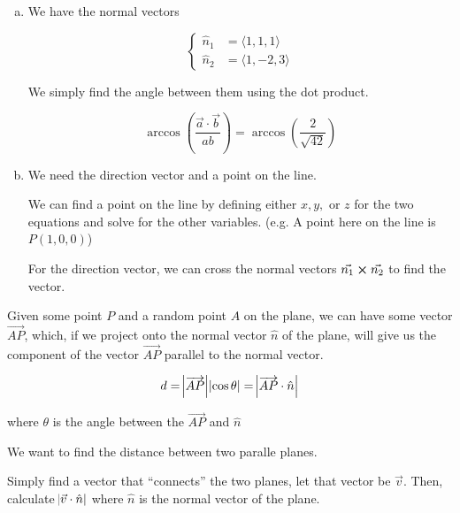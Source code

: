\begin{sol}
	\begin{enumerate}[a)]
		\item We have the normal vectors

		\begin{equation}
			\begin{cases}
				\hat n_1 &= \langle 1, 1, 1 \rangle\\
				\hat n_2 &= \langle 1, -2, 3 \rangle
			\end{cases}
		\end{equation}

		We simply find the angle between them using the dot product.

		\begin{equation}
			\arccos\left(\frac{\vec a \cdot \vec b}{ab}\right) = \arccos\left(\frac{2}{\sqrt{42}}\right)
		\end{equation}

		\item We need the direction vector and a point on the line.
		
		We can find a point on the line by defining either $x, y,$ or $z$ for the two equations and solve for the other variables. (e.g. A point here on the line is $P(1,0,0)$)

		For the direction vector, we can cross the normal vectors $\vec{n_1} \cross \vec{n_2}$ to find the vector.
	\end{enumerate}
\end{sol}

\begin{definition}
	Given some point $P$ and a random point $A$ on the plane, we can have some vector $\overrightarrow{AP}$, which, if we project onto the normal vector $\hat n$ of the plane, will give us the component of the vector $\overrightarrow{AP}$ parallel to the normal vector.

	\begin{equation}
		d = \abs{\overrightarrow{AP}} \abs{\cos\theta} = \abs{\overrightarrow{AP} \cdot \hat n}
	\end{equation}

	where $\theta$ is the angle between the $\overrightarrow{AP}$ and $\hat n$
\end{definition}

\begin{example}
	We want to find the distance between two paralle planes.
\end{example}

\begin{sol}
	Simply find a vector that ``connects'' the two planes, let that vector be $\vec v$. Then, calculate $\abs{\vec v \cdot \hat n}$ where $\hat n$ is the normal vector of the plane.
\end{sol}